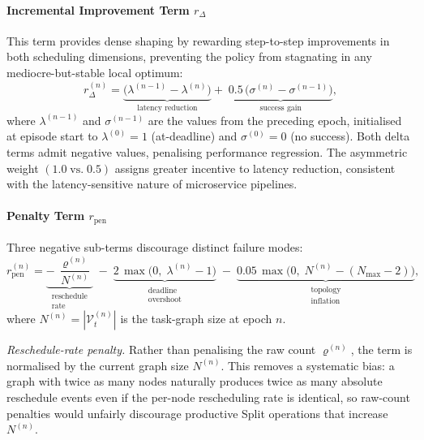 \paragraph{Incremental Improvement Term $r_{\Delta}$}

This term provides dense shaping by rewarding step-to-step
improvements in both scheduling dimensions, preventing the policy
from stagnating in any mediocre-but-stable local optimum:
\begin{equation}
  r_{\Delta}^{(n)} =
    \underbrace{
      \bigl(\lambda^{(n-1)} - \lambda^{(n)}\bigr)
    }_{\text{latency reduction}}
    +\;
    \underbrace{
      0.5\,\bigl(\sigma^{(n)} - \sigma^{(n-1)}\bigr)
    }_{\text{success gain}},
  \label{eq:r_delta}
\end{equation}
where $\lambda^{(n-1)}$ and $\sigma^{(n-1)}$ are the values from
the preceding epoch, initialised at episode start to $\lambda^{(0)}=1$
(at-deadline) and $\sigma^{(0)}=0$ (no success).
Both delta terms admit negative values, penalising performance
regression.
The asymmetric weight $(1.0\;\text{vs.}\;0.5)$ assigns greater
incentive to latency reduction, consistent with the latency-sensitive
nature of microservice pipelines.

\paragraph{Penalty Term $r_{\mathrm{pen}}$}

Three negative sub-terms discourage distinct failure modes:
\begin{equation}
  r_{\mathrm{pen}}^{(n)} =
    \underbrace{
      -\,\frac{\varrho^{(n)}}{N^{(n)}}
    }_{\substack{\text{reschedule} \\ \text{rate}}}
    \;-\;
    \underbrace{
      2\,\max\!\bigl(0,\;\lambda^{(n)} - 1\bigr)
    }_{\substack{\text{deadline} \\ \text{overshoot}}}
    \;-\;
    \underbrace{
      0.05\,\max\!\bigl(0,\;N^{(n)} - (N_{\max}-2)\bigr)
    }_{\substack{\text{topology} \\ \text{inflation}}},
  \label{eq:r_pen}
\end{equation}
where $N^{(n)} = |\mathcal{V}_t^{(n)}|$ is the task-graph size at
epoch $n$.

\textit{Reschedule-rate penalty.}
Rather than penalising the raw count $\varrho^{(n)}$, the term is
normalised by the current graph size $N^{(n)}$.
This removes a systematic bias: a graph with twice as many nodes
naturally produces twice as many absolute reschedule events even if
the per-node rescheduling rate is identical, so raw-count penalties
would unfairly discourage productive Split operations that increase
$N^{(n)}$.

